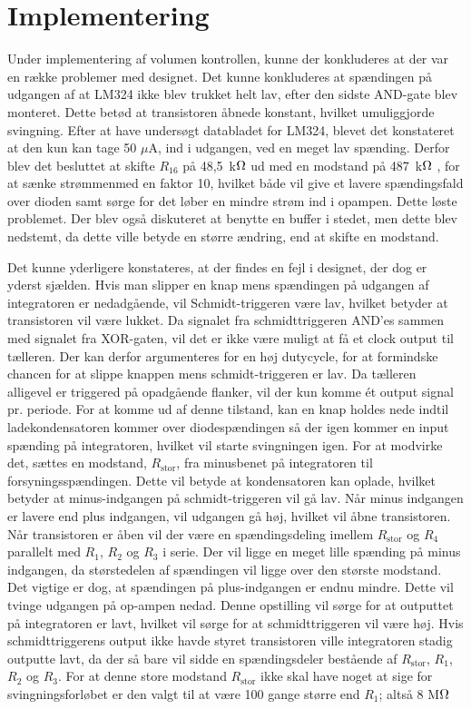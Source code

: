 \section{Implementering}
Under implementering af volumen kontrollen, kunne der konkluderes at der var en række problemer med designet. Det kunne konkluderes at spændingen på udgangen af at LM324 ikke blev trukket helt lav, efter den sidste AND-gate blev monteret. Dette betød at transistoren åbnede konstant, hvilket umuliggjorde svingning. Efter at have undersøgt databladet for LM324, blevet det konstateret at den kun kan tage 50 $\mu$A, ind i udgangen, ved en meget lav spænding. Derfor blev det besluttet at skifte $R_{16}$ på 48,5~k$\ohm$ ud med en modstand på 487~k$\ohm$ , for at sænke strømmenmed en faktor 10, hvilket både vil give et lavere spændingsfald over dioden samt sørge for det løber en mindre strøm ind i opampen. Dette løste problemet. Der blev også diskuteret at benytte en buffer i stedet, men dette blev nedstemt, da dette ville betyde en større ændring, end at skifte en modstand.

Det kunne yderligere konstateres, at der findes en fejl i designet, der dog er yderst sjælden. Hvis man slipper en knap mens spændingen på udgangen af integratoren er nedadgående, vil Schmidt-triggeren være lav, hvilket betyder at transistoren vil være lukket. Da signalet fra schmidttriggeren AND'es sammen med signalet fra XOR-gaten, vil det er ikke være muligt at få et clock output til tælleren. Der kan derfor argumenteres for en høj dutycycle, for at formindske chancen for at slippe knappen mens schmidt-triggeren er lav. Da tælleren alligevel er triggered på opadgående flanker, vil der kun komme ét output signal pr. periode. For at komme ud af denne tilstand, kan en knap holdes nede indtil ladekondensatoren kommer over diodespændingen så der igen kommer en input spænding på integratoren, hvilket vil starte svingningen igen. 
For at modvirke det, sættes en modstand, $R_{\mathrm{stor}}$, fra minusbenet på integratoren til forsyningsspændingen. Dette vil betyde at kondensatoren kan oplade, hvilket betyder at minus-indgangen på schmidt-triggeren vil gå lav. Når minus indgangen er lavere end plus indgangen, vil udgangen gå høj, hvilket vil åbne transistoren. Når transistoren er åben vil der være en spændingsdeling imellem $R_{\mathrm{stor}}$ og $R_4$ parallelt med $R_1$, $R_2$ og $R_3$ i serie. Der vil ligge en meget lille spænding på minus indgangen, da størstedelen af spændingen vil ligge over den største modstand. Det vigtige er dog, at spændingen på plus-indgangen er endnu mindre. Dette vil tvinge udgangen på op-ampen nedad. Denne opstilling vil sørge for at outputtet på integratoren er lavt, hvilket vil sørge for at schmidttriggeren vil være høj. Hvis schmidttriggerens output ikke havde styret transistoren ville integratoren stadig outputte lavt, da der så bare vil sidde en spændingsdeler bestående af $R_{\mathrm{stor}}$, $R_1$, $R_2$ og $R_3$.
For at denne store modstand $R_{\mathrm{stor}}$ ikke skal have noget at sige for svingningsforløbet er den valgt til at være 100 gange større end $R_1$; altså 8 M$\ohm$